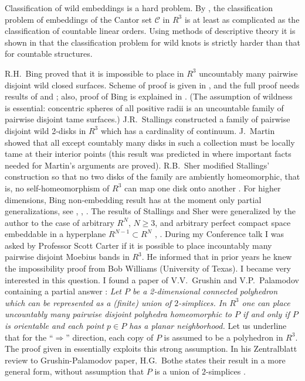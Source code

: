 \documentclass[12pt]{article}
\theoremstyle{definition}
\begin{document}
Classification of wild embeddings is a hard problem.
By \cite[Thm.5.4]{GKB}, the classification problem of embeddings of the Cantor set $\mathcal C$
in $R^3$
is at least as complicated as the classification of countable linear orders.
Using methods of descriptive theory it is shown in \cite{Kulikov} that the classification
problem for wild knots is strictly harder than that for countable structures.

R.H.~Bing proved that 
it is impossible to place in
$R^3$
uncountably many
pairwise disjoint wild closed
surfaces.
Scheme of proof is given in
\cite{Bing-abstr},
and the full proof needs results of
\cite{Bing59} and \cite{Bing-TAMS61};
also, proof of Bing is explained in
\cite[Thm.~3.6.1]{BC}. (The assumption of wildness is essential: concentric spheres 
of all positive radii is an uncountable family
of pairwise disjoint tame surfaces.)
J.R.~Stallings
constructed  \cite{Stallings}
a
family
of
pairwise disjoint wild 2-disks in
$R^3$ which
has a cardinality of continuum.
J.~Martin showed
that
all except countably many disks in such a
collection must be locally tame at their
interior points \cite{Martin} (this result was predicted in
\cite{Bing-TAMS61} where important facts needed
for Martin's arguments are proved).
R.B.~Sher 
modified Stallings' construction so that 
no two
disks of the family 
are ambiently homeomorphic, that
is, no self-homeomorphism of $R^3$ 
can map one disk onto another
\cite{Sher-note}.
For higher dimensions,
Bing 
non-embedding result 
has 
at the moment
only partial
generalizations, see
\cite[Thm. 1, 2]{Bryant},
\cite[Thm. 10.5]{Burgess-75},
\cite[p.383, Thm. 3C.2]{Daverman}.
The results of Stallings and Sher 
were generalized by the author
to the case of arbitrary
$R^N$, $N\geqslant 3$,
and arbitrary perfect compact
space embeddable in a hyperplane
$R^{N-1}\subset R^N$  \cite{Frolkina}, \cite{Frolkina-Thesis}.
During my Conference talk
\cite{Frolkina-Thesis}
I was asked by Professor
Scott Carter 
if it is possible to place incountably many 
pairwise disjoint
Moebius bands in $R^3$.
He informed that in prior years he knew the impossibility proof from Bob Williams (University of Texas).
I became very interested
in this question.
I found a paper of V.V.~Grushin and V.P.~Palamodov 
containing a partial answer
\cite[Thm.~3]{GP}:
{\it 
Let $P$ be a 2-dimensional connected polyhedron which
can be represented as a (finite) union of
$2$-simplices.
In $R^3$ one can place
uncountably many
pairwise disjoint polyhedra
homeomorphic to $P$ if and only if $P$ 
is orientable and each point $p\in P$ has a planar neighborhood.}
Let us underline that for the ``$\Rightarrow $''
direction, each copy of $P$
is assumed to be a polyhedron in $R^3$.
The proof given in \cite{GP}
essentially exploits 
this strong assumption.
In his Zentralblatt review to Grushin-Palamodov paper, H.G.~Bothe
states their
result \cite[Thm.~3]{GP}
in a more general form,
without assumption that
$P$ is a union of $2$-simplices
\cite{Bothe-review}.
\end{document}
